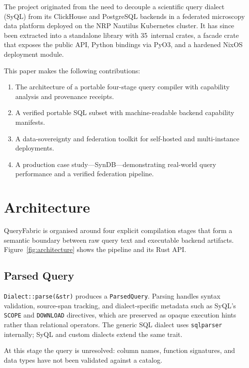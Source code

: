 \documentclass[11pt,a4paper]{article}
\begin{document}
The project originated from the need to decouple a scientific query
dialect (SyQL) from its ClickHouse and PostgreSQL backends in a federated
microscopy data platform deployed on the NRP Nautilus Kubernetes cluster.
It has since been extracted into a standalone library with 35~internal
crates, a facade crate that exposes the public API, Python bindings
via PyO3, and a hardened NixOS deployment module.

This paper makes the following contributions:
\begin{enumerate}
  \item The architecture of a portable four-stage query compiler with
        capability analysis and provenance receipts.
  \item A verified portable SQL subset with machine-readable backend
        capability manifests.
  \item A data-sovereignty and federation toolkit for self-hosted
        and multi-instance deployments.
  \item A production case study---SynDB---demonstrating real-world
        query performance and a verified federation pipeline.
\end{enumerate}

\section{Architecture}
\label{sec:architecture}

QueryFabric is organised around four explicit compilation stages that form
a semantic boundary between raw query text and executable backend artifacts.
Figure~\ref{fig:architecture} shows the pipeline and its Rust API.

\subsection{Parsed Query}
\label{sec:parse}

\texttt{Dialect::parse(\&str)} produces a \texttt{ParsedQuery}.
Parsing handles syntax validation, source-span tracking, and dialect-specific
metadata such as SyQL's \texttt{SCOPE} and \texttt{DOWNLOAD} directives,
which are preserved as opaque execution hints rather than relational operators.
The generic SQL dialect uses \texttt{sqlparser} internally; SyQL and custom
dialects extend the same trait.

At this stage the query is unresolved: column names, function signatures,
and data types have not been validated against a catalog.
\end{document}
